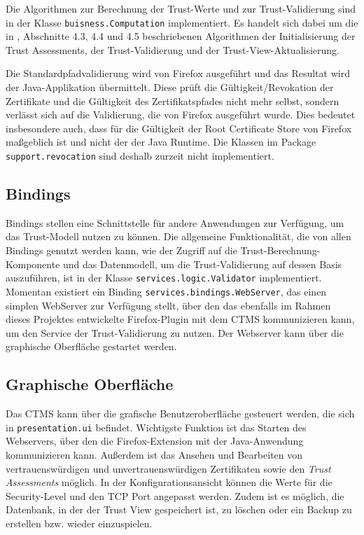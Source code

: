 \documentclass[accentcolor=tud1c,article,colorback,11pt]{tudreport}
\begin{document}
Die Algorithmen zur Berechnung der Trust-Werte und zur Trust-Validierung sind in der Klasse \texttt{buisness.Computation} implementiert. Es handelt sich dabei um die in \cite{braun2013trust}, Abschnitte 4.3, 4.4 und 4.5 beschriebenen Algorithmen der Initialisierung der Trust Assessments, der Trust-Validierung und der Trust-View-Aktualisierung.

Die Standardpfadvalidierung wird von Firefox ausgeführt und das Resultat wird der Java-Applikation übermittelt. Diese prüft die Gültigkeit/Revokation der Zertifikate und die Gültigkeit des Zertifikatspfades nicht mehr selbst, sondern verlässt sich auf die Validierung, die von Firefox ausgeführt wurde. Dies bedeutet insbesondere auch, dass für die Gültigkeit der Root Certificate Store von Firefox maßgeblich ist und nicht der der Java Runtime. Die Klassen im Package \texttt{support.revocation} sind deshalb zurzeit nicht implementiert.

\subsection{Bindings}
Bindings stellen eine Schnittstelle für andere Anwendungen zur Verfügung, um das Trust-Modell nutzen zu können. Die allgemeine Funktionalität, die von allen Bindings genutzt werden kann, wie der Zugriff auf die Trust-Berechnung-Komponente und das Datenmodell, um die Trust-Validierung auf dessen Basis auszuführen, ist in der Klasse \texttt{services.logic.Validator} implementiert. Momentan existiert ein Binding \texttt{services.bindings.WebServer}, das einen simplen WebServer zur Verfügung stellt, über den das ebenfalls im Rahmen dieses Projektes entwickelte Firefox-Plugin mit dem CTMS kommunizieren kann, um den Service der Trust-Validierung zu nutzen. Der Webserver kann über die graphische Oberfläche gestartet werden.

\subsection{Graphische Oberfläche}
Das CTMS kann über die grafische Benutzeroberfläche gesteuert werden, die sich in \texttt{presentation.ui} befindet. Wichtigste Funktion ist das Starten des Webservers, über den die Firefox-Extension mit der Java-Anwendung kommunizieren kann. Außerdem ist das Ansehen und Bearbeiten von vertrauenswürdigen und unvertrauenswürdigen Zertifikaten sowie den \textit{Trust Assessments} möglich. In der Konfigurationsansicht können die Werte für die Security-Level und den TCP Port angepasst werden. Zudem ist es möglich, die Datenbank, in der der Trust View gespeichert ist, zu löschen oder ein Backup zu erstellen bzw. wieder einzuspielen.
\end{document}
